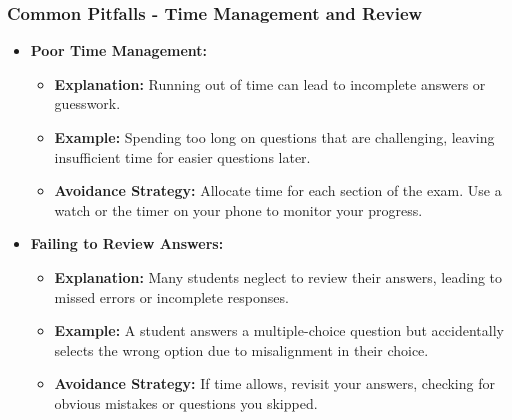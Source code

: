 \documentclass{beamer}
\begin{document}
\begin{frame}[fragile]
    \frametitle{Common Pitfalls - Time Management and Review}
    \begin{itemize}
        \item \textbf{Poor Time Management:}
        \begin{itemize}
            \item \textbf{Explanation:} Running out of time can lead to incomplete answers or guesswork.
            \item \textbf{Example:} Spending too long on questions that are challenging, leaving insufficient time for easier questions later.
            \item \textbf{Avoidance Strategy:} Allocate time for each section of the exam. Use a watch or the timer on your phone to monitor your progress.
        \end{itemize}

        \item \textbf{Failing to Review Answers:}
        \begin{itemize}
            \item \textbf{Explanation:} Many students neglect to review their answers, leading to missed errors or incomplete responses.
            \item \textbf{Example:} A student answers a multiple-choice question but accidentally selects the wrong option due to misalignment in their choice.
            \item \textbf{Avoidance Strategy:} If time allows, revisit your answers, checking for obvious mistakes or questions you skipped.
        \end{itemize}
    \end{itemize}
\end{frame}
\end{document}
